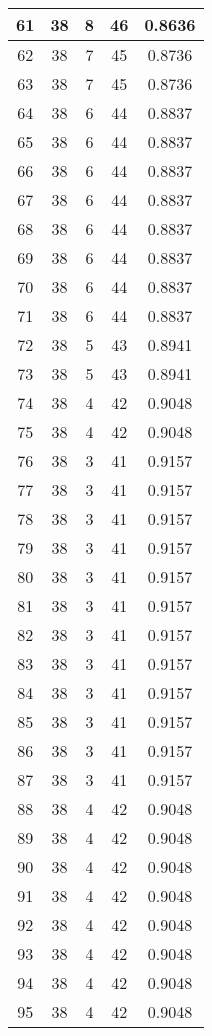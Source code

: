 \documentclass[letterpaper, 12pt]{article}
\begin{document}
\begin{longtable}{|c|c|c|c|c|}
\hline
61 & 38 & 8 & 46 & 0.8636 \\
\hline
62 & 38 & 7 & 45 & 0.8736 \\
\hline
63 & 38 & 7 & 45 & 0.8736 \\
\hline
64 & 38 & 6 & 44 & 0.8837 \\
\hline
65 & 38 & 6 & 44 & 0.8837 \\
\hline
66 & 38 & 6 & 44 & 0.8837 \\
\hline
67 & 38 & 6 & 44 & 0.8837 \\
\hline
68 & 38 & 6 & 44 & 0.8837 \\
\hline
69 & 38 & 6 & 44 & 0.8837 \\
\hline
70 & 38 & 6 & 44 & 0.8837 \\
\hline
71 & 38 & 6 & 44 & 0.8837 \\
\hline
72 & 38 & 5 & 43 & 0.8941 \\
\hline
73 & 38 & 5 & 43 & 0.8941 \\
\hline
74 & 38 & 4 & 42 & 0.9048 \\
\hline
75 & 38 & 4 & 42 & 0.9048 \\
\hline
76 & 38 & 3 & 41 & 0.9157 \\
\hline
77 & 38 & 3 & 41 & 0.9157 \\
\hline
78 & 38 & 3 & 41 & 0.9157 \\
\hline
79 & 38 & 3 & 41 & 0.9157 \\
\hline
80 & 38 & 3 & 41 & 0.9157 \\
\hline
81 & 38 & 3 & 41 & 0.9157 \\
\hline
82 & 38 & 3 & 41 & 0.9157 \\
\hline
83 & 38 & 3 & 41 & 0.9157 \\
\hline
84 & 38 & 3 & 41 & 0.9157 \\
\hline
85 & 38 & 3 & 41 & 0.9157 \\
\hline
86 & 38 & 3 & 41 & 0.9157 \\
\hline
87 & 38 & 3 & 41 & 0.9157 \\
\hline
88 & 38 & 4 & 42 & 0.9048 \\
\hline
89 & 38 & 4 & 42 & 0.9048 \\
\hline
90 & 38 & 4 & 42 & 0.9048 \\
\hline
91 & 38 & 4 & 42 & 0.9048 \\
\hline
92 & 38 & 4 & 42 & 0.9048 \\
\hline
93 & 38 & 4 & 42 & 0.9048 \\
\hline
94 & 38 & 4 & 42 & 0.9048 \\
\hline
95 & 38 & 4 & 42 & 0.9048 \\

\end{longtable}
\end{document}

